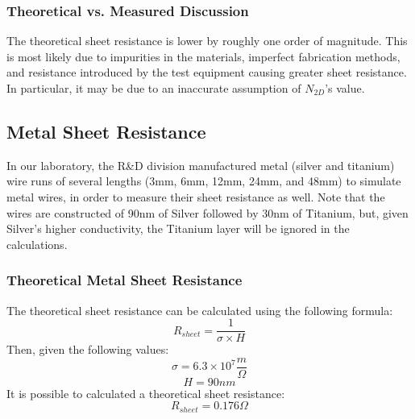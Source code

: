 \documentclass[12pt]{article}
\begin{document}
\subsubsection{Theoretical vs. Measured Discussion}
The theoretical sheet resistance is lower by roughly one order of magnitude. This is most likely due to impurities in the materials, imperfect fabrication methods, and resistance introduced by the test equipment causing greater sheet resistance. In particular, it may be due to an inaccurate assumption of $N_{2D}$'s value.


\subsection{Metal Sheet Resistance}
In our laboratory, the R\&D division manufactured metal (silver and titanium) wire runs of several lengths (3mm, 6mm, 12mm, 24mm, and 48mm) to simulate metal wires, in order to measure their sheet resistance as well. Note that the wires are constructed of 90nm of Silver followed by 30nm of Titanium, but, given Silver's higher conductivity, the Titanium layer will be ignored in the calculations.

\subsubsection{Theoretical Metal Sheet Resistance}
The theoretical sheet resistance can be calculated using the following formula:
\[ R_{sheet} = \frac{1}{\sigma \times H} \]
Then, given the following values:
\[\sigma = 6.3 \times 10^7 \frac{m}{\Omega} \]
\[H = 90nm \]
It is possible to calculated a theoretical sheet resistance:
\[R_{sheet} = 0.176\Omega \]
\end{document}
